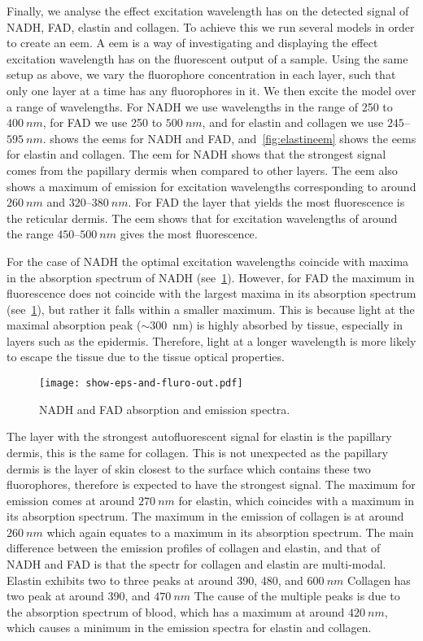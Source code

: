 Finally, we analyse the effect excitation wavelength has on the detected signal of NADH, FAD, elastin and collagen.
To achieve this we run several models in order to create an \gls*{eem}.
A \gls*{eem} is a way of investigating and displaying the effect excitation wavelength has on the fluorescent output of a sample.
Using the same setup as above, we vary the fluorophore concentration in each layer, such that only one layer at a time has any fluorophores in it.
We then excite the model over a range of wavelengths.
For NADH we use wavelengths in the range of 250 to $400~nm$, for FAD we use 250 to $500~nm$, and for elastin and collagen we use $245$--$595~nm$.
 shows the \gls*{eem}s for NADH and FAD, and~\cref{fig:elastineem} shows the \gls*{eem}s for elastin and collagen.
The \gls*{eem} for NADH shows that the strongest signal comes from the papillary dermis when compared to other layers.
The \gls*{eem} also shows a maximum of emission for excitation wavelengths corresponding to around $260~nm$ and $320$--$380~nm$.
For FAD the layer that yields the most fluorescence is the reticular dermis.
The \gls*{eem} shows that for excitation wavelengths of around the range $450$--$500~nm$ gives the most fluorescence.

For the case of NADH the optimal excitation wavelengths coincide with maxima in the absorption spectrum of NADH (see~\cref{fig:epsfluro}).
However, for FAD the maximum in fluorescence does not coincide with the largest maxima in its absorption spectrum (see~\cref{fig:epsfluro}), but rather it falls within a smaller maximum.
This is because light at the maximal absorption peak ($\sim$300~nm) is highly absorbed by tissue, especially in layers such as the epidermis.
Therefore, light at a longer wavelength is more likely to escape the tissue due to the tissue optical properties.

\begin{figure}[!htpb]
    \centering
    \texttt{[image: show-eps-and-fluro-out.pdf]}
    \caption{NADH and FAD absorption and emission spectra.}
    \label{fig:epsfluro}
\end{figure}


The layer with the strongest autofluorescent signal for elastin is the papillary dermis, this is the same for collagen.
This is not unexpected as the papillary dermis is the layer of skin closest to the surface which contains these two fluorophores, therefore is expected to have the strongest signal.
The maximum for emission comes at around $270~nm$ for elastin, which coincides with a maximum in its absorption spectrum.
The maximum in the emission of collagen is at around $260~nm$ which again equates to a maximum in its absorption spectrum.
The main difference between the emission profiles of collagen and elastin, and that of NADH and FAD is that the spectr for collagen and elastin are multi-modal.
Elastin exhibits two to three peaks at around 390, 480, and $600~nm$
Collagen has two peak at around 390, and $470~nm$
The cause of the multiple peaks is due to the absorption spectrum of blood, which has a maximum at around $420~nm$, which causes a minimum in the emission spectra for elastin and collagen.

